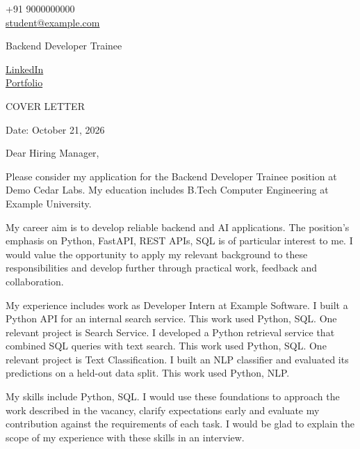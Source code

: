 \documentclass[11pt,a4paper]{article}
\begin{document}
\begin{center}
  \begin{minipage}[b]{0.24\textwidth}
    \raggedright\small +91 9000000000\\ \href{mailto:student@example.com}{student@example.com}
  \end{minipage}%
  \begin{minipage}[b]{0.50\textwidth}
    \par\vspace{0.1cm}
    {\color{UI_blue}\Large Backend Developer Trainee}
  \end{minipage}%
  \begin{minipage}[b]{0.24\textwidth}
    \raggedleft\small \href{https://linkedin.com/in/student-example}{LinkedIn}\\ \href{https://student-portfolio.example.com}{Portfolio}
  \end{minipage}
  \par\vspace{0.15cm}{\color{UI_blue}\hrulefill}
\end{center}
\setlength{\parindent}{0pt}
\setlength{\parskip}{12pt}
\begin{center}{\color{UI_blue}\Large COVER LETTER}\end{center}
Date: October 21, 2026\par
Dear Hiring Manager,\par
Please consider my application for the Backend Developer Trainee position at Demo Cedar Labs. My education includes B.Tech Computer Engineering at Example University.\par
My career aim is to develop reliable backend and AI applications. The position’s emphasis on Python, FastAPI, REST APIs, SQL is of particular interest to me. I would value the opportunity to apply my relevant background to these responsibilities and develop further through practical work, feedback and collaboration.\par
My experience includes work as Developer Intern at Example Software. I built a Python API for an internal search service. This work used Python, SQL. One relevant project is Search Service. I developed a Python retrieval service that combined SQL queries with text search. This work used Python, SQL. One relevant project is Text Classification. I built an NLP classifier and evaluated its predictions on a held-out data split. This work used Python, NLP.\par
My skills include Python, SQL. I would use these foundations to approach the work described in the vacancy, clarify expectations early and evaluate my contribution against the requirements of each task. I would be glad to explain the scope of my experience with these skills in an interview.\par
\end{document}
